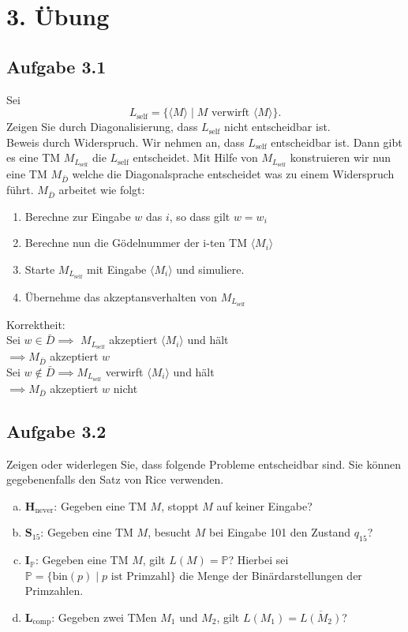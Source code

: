 \section*{3. Übung}
\subsection*{Aufgabe 3.1}
Sei $$L_\text{self} = \{\langle M \rangle \mid M \text{ verwirft } \langle M \rangle \}.$$
Zeigen Sie durch Diagonalisierung, dass $L_\text{self}$ nicht entscheidbar ist.\\

Beweis durch Widerspruch. Wir nehmen an, dass $L_\text{self}$
entscheidbar ist. Dann gibt es eine TM $M_{L_{\text{self}}}$ die
$L_\text{self}$ entscheidet. Mit Hilfe von $M_{L_{\text{self}}}$
konstruieren wir nun eine TM $M_{\bar{D}}$ welche die
Diagonalsprache entscheidet was zu einem Widerspruch führt. 
$M_{\bar{D}}$ arbeitet wie folgt:

\begin{enumerate}
    \item Berechne zur Eingabe $w$ das $i$, so dass gilt $w = w_i$
    \item Berechne nun die Gödelnummer der i-ten TM 
    $\langle M_i \rangle$
    \item Starte $M_{L_{\text{self}}}$ mit Eingabe 
            $\langle M_i \rangle$ und simuliere.
    \item Übernehme das akzeptansverhalten von $M_{L_{\text{self}}}$
\end{enumerate}

Korrektheit:\\

Sei $w \in \bar{D} \implies$ $M_{L_{\text{self}}}$ akzeptiert
$\langle M_i \rangle$ und hält\\
$\implies M_{\bar{D}}$ akzeptiert $w$\\

Sei $w \not\in \bar{D} \implies M_{L_{\text{self}}}$ verwirft
$\langle M_i \rangle$ und hält\\
$\implies M_{\bar{D}}$ akzeptiert $w$ nicht\\

\subsection*{Aufgabe 3.2}
Zeigen oder widerlegen Sie, dass folgende Probleme entscheidbar sind. Sie können gegebenenfalls den Satz von Rice verwenden.
\begin{enumerate}[(a)]
	\item $\textbf{H}_\text{never}$: Gegeben eine TM $M$, stoppt $M$ auf keiner Eingabe?
	\item $\textbf{S}_{15}$: Gegeben eine TM $M$, besucht $M$ bei Eingabe 101 den Zustand $q_{15}$?
	\item $\textbf{I}_\mathbb{P}$: Gegeben eine TM $M$, gilt $L(M)= \mathbb{P}$? Hierbei sei $\mathbb{P} = \{\text{bin}(p) \mid p \text{ ist Primzahl} \}$ die Menge der Binärdarstellungen der Primzahlen.
	\item $\textbf{L}_\text{comp}$: Gegeben zwei TMen $M_1$ und $M_2$, gilt $L(M_1) = \overline{L(M_2)}$?
\end{enumerate}

